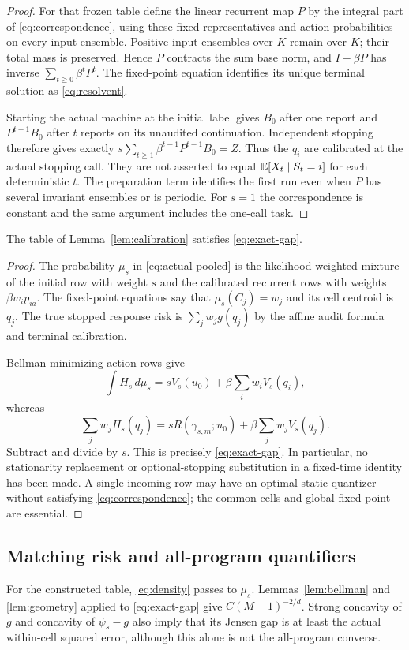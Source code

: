 \begin{proof}
For that frozen table define the linear recurrent map $P$ by the integral part of \eqref{eq:correspondence}, using these fixed representatives and action probabilities on every input ensemble. Positive input ensembles over $K$ remain over $K$; their total mass is preserved. Hence $P$ contracts the sum base norm, and $I-\beta P$ has inverse $\sum_{t\ge0}\beta^tP^t$. The fixed-point equation identifies its unique terminal solution as \eqref{eq:resolvent}.

Starting the actual machine at the initial label gives $B_0$ after one report and $P^{t-1}B_0$ after $t$ reports on its unaudited continuation. Independent stopping therefore gives exactly $s\sum_{t\ge1}\beta^{t-1}P^{t-1}B_0=Z$. Thus the $q_i$ are calibrated at the actual stopping call. They are not asserted to equal $\mathbb E[X_t\mid S_t=i]$ for each deterministic $t$. The preparation term identifies the first run even when $P$ has several invariant ensembles or is periodic. For $s=1$ the correspondence is constant and the same argument includes the one-call task.
\end{proof}

\begin{lemma}\label{lem:regret}
The table of Lemma~\ref{lem:calibration} satisfies \eqref{eq:exact-gap}.
\end{lemma}
\begin{proof}
The probability $\mu_s$ in \eqref{eq:actual-pooled} is the likelihood-weighted mixture of the initial row with weight $s$ and the calibrated recurrent rows with weights $\beta w_ip_{ia}$. The fixed-point equations say that $\mu_s(C_j)=w_j$ and its cell centroid is $q_j$. The true stopped response risk is $\sum_jw_jg(q_j)$ by the affine audit formula and terminal calibration.

Bellman-minimizing action rows give
\[
 \int H_s\,d\mu_s
     =sV_s(u_0)+\beta\sum_iw_iV_s(q_i),
\]
whereas
\[
 \sum_jw_jH_s(q_j)
     =sR(\gamma_{s,m};u_0)+\beta\sum_jw_jV_s(q_j).
\]
Subtract and divide by $s$. This is precisely \eqref{eq:exact-gap}. In particular, no stationarity replacement or optional-stopping substitution in a fixed-time identity has been made. A single incoming row may have an optimal static quantizer without satisfying \eqref{eq:correspondence}; the common cells and global fixed point are essential.
\end{proof}

\subsection{Matching risk and all-program quantifiers}
For the constructed table, \eqref{eq:density} passes to $\mu_s$. Lemmas~\ref{lem:bellman} and \ref{lem:geometry} applied to \eqref{eq:exact-gap} give $C(M-1)^{-2/d}$. Strong concavity of $g$ and concavity of $\psi_s-g$ also imply that its Jensen gap is at least the actual within-cell squared error, although this alone is not the all-program converse.

